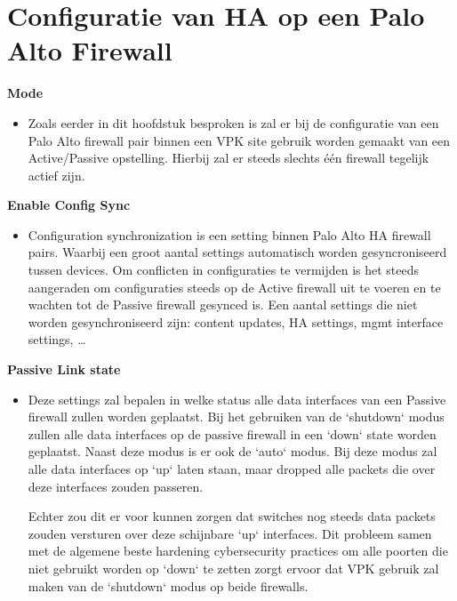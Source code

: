 \section{Configuratie van HA op een Palo Alto Firewall}

\textbf{Mode}
\begin{itemize}[label=\textbullet]
    \item Zoals eerder in dit hoofdstuk besproken is zal er bij de configuratie van een Palo Alto firewall pair binnen een VPK site gebruik worden gemaakt van een Active/Passive opstelling. Hierbij zal er steeds slechts één firewall tegelijk actief zijn.
\end{itemize}



\textbf{Enable Config Sync}
\begin{itemize}[label=\textbullet]
    \item Configuration synchronization is een setting binnen Palo Alto HA firewall pairs. Waarbij een groot aantal settings automatisch worden gesyncroniseerd tussen devices. Om conflicten in configuraties te vermijden is het steeds aangeraden om configuraties steeds op de Active firewall uit te voeren en te wachten tot de Passive firewall gesynced is. Een aantal settings die niet worden gesynchroniseerd zijn: content updates, HA settings, mgmt interface settings, \ldots 
\end{itemize}



\textbf{Passive Link state}
\begin{itemize}[label=\textbullet]
    \item Deze settings zal bepalen in welke status alle data interfaces van een Passive firewall zullen worden geplaatst. Bij het gebruiken van de `shutdown` modus zullen alle data interfaces op de passive firewall in een `down` state worden geplaatst. Naast deze modus is er ook de `auto` modus. Bij deze modus zal alle data interfaces op `up` laten staan, maar dropped alle packets die over deze interfaces zouden passeren. 
    
    \vspace{5mm}
    Echter zou dit er voor kunnen zorgen dat switches nog steeds data packets zouden versturen over deze schijnbare `up` interfaces. Dit probleem samen met de algemene beste hardening cybersecurity practices om alle poorten die niet gebruikt worden op `down` te zetten zorgt ervoor dat VPK gebruik zal maken van de `shutdown` modus op beide firewalls.
\end{itemize}



